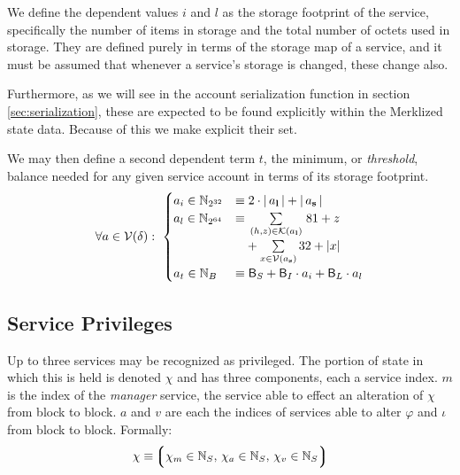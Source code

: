 We define the dependent values $i$ and $l$ as the storage footprint of the service, specifically the number of items in storage and the total number of octets used in storage. They are defined purely in terms of the storage map of a service, and it must be assumed that whenever a service's storage is changed, these change also.

Furthermore, as we will see in the account serialization function in section \ref{sec:serialization}, these are expected to be found explicitly within the Merklized state data. Because of this we make explicit their set.

We may then define a second dependent term $t$, the minimum, or \emph{threshold}, balance needed for any given service account in terms of its storage footprint.
\begin{align}
  \forall a \in \mathcal{V}(\delta):\ \begin{cases}
    a_i \in \mathbb{N}_{2^{32}} &\equiv 2\cdot|\,a_\mathbf{l}\,| + |\,a_\mathbf{s}\,| \\
    a_l \in \mathbb{N}_{2^{64}} &\equiv \sum\limits_{\,(h, z) \in \mathcal{K}(a_\mathbf{l})\,} 81 + z \\
    &\phantom{\equiv} + \sum\limits_{x \in \mathcal{V}(a_\mathbf{s})} 32 + |x| \\
    a_t \in \mathbb{N}_B &\equiv \mathsf{B}_S + \mathsf{B}_I \cdot a_i + \mathsf{B}_L \cdot a_l
  \end{cases}
\end{align}





\subsection{Service Privileges}
Up to three services may be recognized as privileged. The portion of state in which this is held is denoted $\chi$ and has three components, each a service index. $m$ is the index of the \emph{manager} service, the service able to effect an alteration of $\chi$ from block to block. $a$ and $v$ are each the indices of services able to alter $\varphi$ and $\iota$ from block to block. Formally:
\begin{align}
  \chi \equiv \ltuple\isa{\chi_m}{\N_S}\ts\isa{\chi_a}{\N_S}\ts\isa{\chi_v}{\N_S}\rtuple
\end{align}